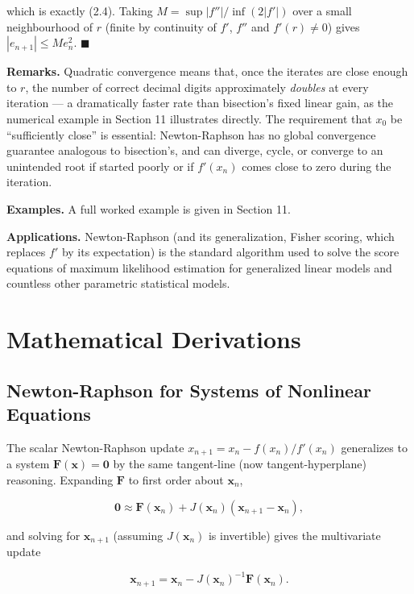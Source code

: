 \documentclass[
]{article}
\begin{document}
which is exactly (2.4). Taking \(M = \sup |f''|/\inf(2|f'|)\) over a
small neighbourhood of \(r\) (finite by continuity of \(f'\), \(f''\)
and \(f'(r)\ne0\)) gives \(|e_{n+1}| \le M e_n^2\). \(\blacksquare\)

\textbf{Remarks.} Quadratic convergence means that, once the iterates
are close enough to \(r\), the number of correct decimal digits
approximately \emph{doubles} at every iteration --- a dramatically
faster rate than bisection's fixed linear gain, as the numerical example
in Section 11 illustrates directly. The requirement that \(x_0\) be
``sufficiently close'' is essential: Newton-Raphson has no global
convergence guarantee analogous to bisection's, and can diverge, cycle,
or converge to an unintended root if started poorly or if \(f'(x_n)\)
comes close to zero during the iteration.

\textbf{Examples.} A full worked example is given in Section 11.

\textbf{Applications.} Newton-Raphson (and its generalization, Fisher
scoring, which replaces \(f'\) by its expectation) is the standard
algorithm used to solve the score equations of maximum likelihood
estimation for generalized linear models and countless other parametric
statistical models.

\section{Mathematical Derivations}\label{mathematical-derivations}

\subsection{Newton-Raphson for Systems of Nonlinear
Equations}\label{newton-raphson-for-systems-of-nonlinear-equations}

The scalar Newton-Raphson update \(x_{n+1}=x_n-f(x_n)/f'(x_n)\)
generalizes to a system \(\mathbf F(\mathbf x)=\mathbf 0\) by the same
tangent-line (now tangent-hyperplane) reasoning. Expanding \(\mathbf F\)
to first order about \(\mathbf x_n\),

\[
\mathbf 0 \approx \mathbf F(\mathbf x_n) + J(\mathbf x_n)(\mathbf x_{n+1}-\mathbf x_n),
\]

and solving for \(\mathbf x_{n+1}\) (assuming \(J(\mathbf x_n)\) is
invertible) gives the multivariate update

\[
\mathbf x_{n+1} = \mathbf x_n - J(\mathbf x_n)^{-1}\mathbf F(\mathbf x_n).
\tag{2.5}
\]
\end{document}
